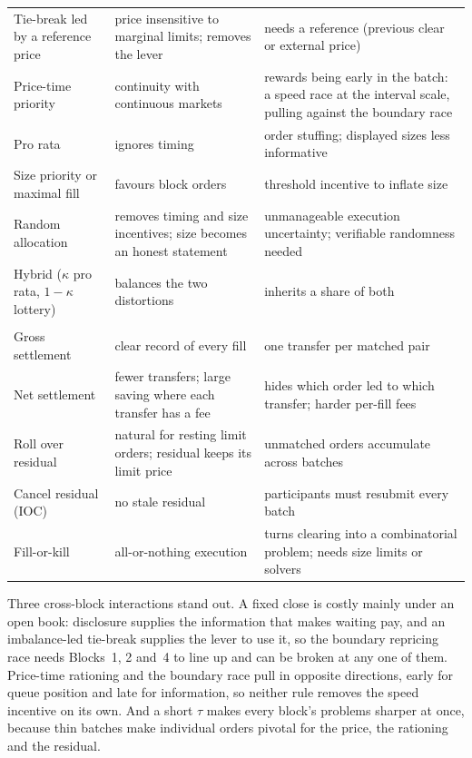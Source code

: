 \begin{longtable}{@{}>{\raggedright\arraybackslash}p{3.2cm}
  >{\raggedright\arraybackslash}p{7.2cm}
  >{\raggedright\arraybackslash}p{5.6cm}@{}}
Tie-break led by a reference price &
price insensitive to marginal limits; removes the lever &
needs a reference (previous clear or external price)\\
Price-time priority &
continuity with continuous markets &
rewards being early in the batch: a speed race at the interval scale, pulling against the boundary race\\
Pro rata &
ignores timing &
order stuffing; displayed sizes less informative\\
Size priority or maximal fill &
favours block orders &
threshold incentive to inflate size\\
Random allocation &
removes timing and size incentives; size becomes an honest statement &
unmanageable execution uncertainty; verifiable randomness needed\\
Hybrid ($\kappa$ pro rata, $1-\kappa$ lottery) &
balances the two distortions &
inherits a share of both\\
\midrule
\multicolumn{3}{@{}l}{\emph{Block 5: settlement and residual (\Cref{sec:settlement})}}\\
Gross settlement &
clear record of every fill &
one transfer per matched pair\\
Net settlement &
fewer transfers; large saving where each transfer has a fee &
hides which order led to which transfer; harder per-fill fees\\
Roll over residual &
natural for resting limit orders; residual keeps its limit price &
unmatched orders accumulate across batches\\
Cancel residual (IOC) &
no stale residual &
participants must resubmit every batch\\
Fill-or-kill &
all-or-nothing execution &
turns clearing into a combinatorial problem; needs size limits or solvers\\
\end{longtable}
\endgroup

Three cross-block interactions stand out. A fixed close is costly mainly
under an open book: disclosure supplies the information that makes waiting
pay, and an imbalance-led tie-break supplies the lever to use it, so the
boundary repricing race needs Blocks~1, 2 and~4 to line up and can be
broken at any one of them. Price-time rationing and the boundary race pull
in opposite directions, early for queue position and late for
information, so neither rule removes the speed incentive on its own. And a
short $\tau$ makes every block's problems sharper at once, because thin
batches make individual orders pivotal for the price, the rationing and the
residual.
